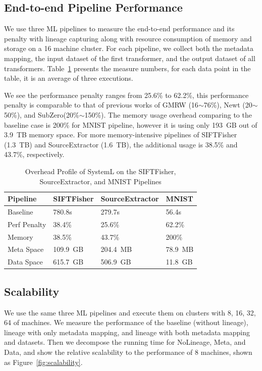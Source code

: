 \documentclass{sig-alternate}
\begin{document}
\subsection{End-to-end Pipeline Performance}
We use three ML pipelines to measure the end-to-end performance and its penalty with lineage capturing
along with resource consumption of memory and storage on a 16 machine cluster.
For each pipeline, we collect both the metadata mapping, the input dataset of the first transformer,  and the output dataset of all transformers.
Table~\ref{tb:apps-overhead} presents the measure numbers, for each data point in the table, it is an
average of three executions. 

We see the performance penalty ranges from 25.6\% to 62.2\%, this performance penalty is comparable to that
of previous works of GMRW (16$\sim$76\%), Newt (20$\sim$50\%), and SubZero(20\%$\sim$150\%).
The memory usage overhead comparing to the baseline case is 200\% for MNIST pipeline, however it is using only
193~GB out of 3.9~TB memory space. 
For more memory-intensive pipelines of SIFTFisher (1.3~TB) and SourceExtractor (1.6~TB), the additional usage is 38.5\% and 43.7\%, respectively.

\begin{table}[ht]
\begin{center}
    \caption{Overhead Profile of SystemL on the SIFTFisher, SourceExtractor, and MNIST Pipelines}
    \begin{scriptsize}
    \begin{tabular}{ | p{1.8cm} | p{1.8cm} | p{1.8cm} | p{1.5cm} | }
    \hline
    Pipeline & SIFTFisher & SourceExtractor & MNIST  \\ \hline \hline
    Baseline & 780.8s & 279.7s & 56.4s \\ \hline
    Perf Penalty & 38.4\% & 25.6\% & 62.2\%   \\ \hline
    Memory & 38.5\% & 43.7\% & 200\%\\ \hline
    Meta Space & 109.9~GB & 204.4~MB & 78.9~MB \\ \hline
    Data Space & 615.7~GB & 506.9~GB & 11.8~GB\\ \hline
    \end{tabular}
    \end{scriptsize}
    \label{tb:apps-overhead}
\end{center}   
\end{table}

\subsection{Scalability}
We use the same three ML pipelines and execute them on clusters with {8, 16, 32, 64} of machines.
We measure the performance of the baseline (without lineage), lineage with only metadata mapping, 
and lineage with both metadata mapping and datasets. 
Then we decompose the running time for NoLineage, Meta, and Data, and show the relative scalability
 to the performance of 8 machines, shown as Figure~\ref{fig:scalability}.
\end{document}
